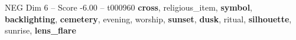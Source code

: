 \begin{textsample}{NEG Dim 6 – Score -6.00 – t000960}  \label{ex:f6_neg_036}
\textbf{cross}, religious\_item, \textbf{symbol}, \textbf{backlighting}, \textbf{cemetery}, evening, worship, \textbf{sunset}, \textbf{dusk}, ritual, \textbf{silhouette}, sunrise, \textbf{lens\_flare}

\end{textsample}

